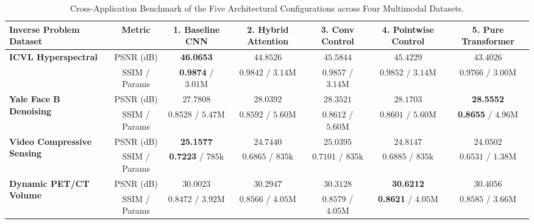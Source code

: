 \begin{table}[htbp]
\centering
\caption{Cross-Application Benchmark of the Five Architectural Configurations across Four Multimodal Datasets.}
\label{tab:cross_application_benchmark}
\begin{adjustbox}{width=\textwidth}
\begin{tabular}{lcccccc}
\toprule
\textbf{Inverse Problem Dataset} & \textbf{Metric} & \textbf{1. Baseline CNN} & \textbf{2. Hybrid Attention} & \textbf{3. Conv Control} & \textbf{4. Pointwise Control} & \textbf{5. Pure Transformer} \\
\midrule
\multirow{2}{*}{\textbf{ICVL Hyperspectral}} & PSNR (dB) & \textbf{46.0653} & $44.8526$ & $45.5844$ & $45.4229$ & $43.4026$ \\
& SSIM / Params & \textbf{0.9874} / $3.01\text{M}$ & $0.9842$ / $3.14\text{M}$ & $0.9857$ / $3.14\text{M}$ & $0.9852$ / $3.14\text{M}$ & $0.9766$ / $3.00\text{M}$ \\
\midrule
\multirow{2}{*}{\textbf{Yale Face B Denoising}} & PSNR (dB) & $27.7808$ & $28.0392$ & $28.3521$ & $28.1703$ & \textbf{28.5552} \\
& SSIM / Params & $0.8528$ / $5.47\text{M}$ & $0.8592$ / $5.60\text{M}$ & $0.8612$ / $5.60\text{M}$ & $0.8601$ / $5.60\text{M}$ & \textbf{0.8655} / $4.96\text{M}$ \\
\midrule
\multirow{2}{*}{\textbf{Video Compressive Sensing}} & PSNR (dB) & \textbf{25.1577} & $24.7440$ & $25.0395$ & $24.8147$ & $24.0502$ \\
& SSIM / Params & \textbf{0.7223} / $785\text{k}$ & $0.6865$ / $835\text{k}$ & $0.7101$ / $835\text{k}$ & $0.6885$ / $835\text{k}$ & $0.6531$ / $1.38\text{M}$ \\
\midrule
\multirow{2}{*}{\textbf{Dynamic PET/CT Volume}} & PSNR (dB) & $30.0023$ & $30.2947$ & $30.3128$ & \textbf{30.6212} & $30.4056$ \\
& SSIM / Params & $0.8472$ / $3.92\text{M}$ & $0.8566$ / $4.05\text{M}$ & $0.8579$ / $4.05\text{M}$ & \textbf{0.8621} / $4.05\text{M}$ & $0.8585$ / $3.66\text{M}$ \\
\bottomrule
\end{tabular}
\end{adjustbox}
\end{table}

